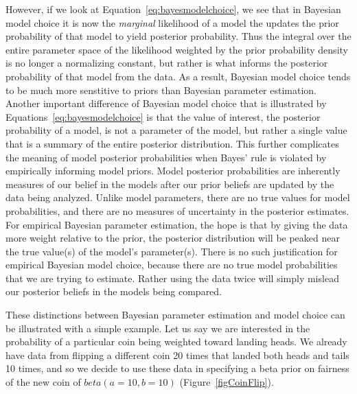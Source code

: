 However, if we look at Equation~\ref{eq:bayesmodelchoice}, we see that in
Bayesian model choice it is now the \emph{marginal} likelihood of a model
the updates the prior probability of that model to yield posterior
probability.
Thus the integral over the entire parameter space of the likelihood weighted by
the prior probability density is no longer a normalizing constant, but rather
is what informs the posterior probability of that model from the data.
As a result, Bayesian model choice tends to be much more senstitive to priors
than Bayesian parameter estimation.
Another important difference of Bayesian model choice that is illustrated by
Equations~\ref{eq:bayesmodelchoice} is that the value of interest, the
posterior probability of a model, is not a parameter of the model, but rather a
single value that is a summary of the entire posterior distribution.
This further complicates the meaning of model posterior probabilities when
Bayes' rule is violated by empirically informing model priors.
Model posterior probabilities are inherently measures of our belief in
the models after our prior beliefs are updated by the data being analyzed.
Unlike model parameters, there are no true values for model probabilities,
and there are no measures of uncertainty in the posterior estimates. 
For empirical Bayesian parameter estimation, the hope is that by giving the
data more weight relative to the prior, the posterior distribution will be
peaked near the true value(s) of the model's parameter(s).
There is no such justification for empirical Bayesian model choice, because
there are no true model probabilities that we are trying to estimate.
Rather using the data twice will simply mislead our posterior
beliefs in the models being compared.

These distinctions between Bayesian parameter estimation and model choice can
be illustrated with a simple example.
Let us say we are interested in the probability of a particular coin
being weighted toward landing heads.
We already have data from flipping a different coin 20 times
that landed both heads and tails 10 times, and so we decide to use
these data in specifying a beta prior on fairness of the new coin of
$beta(a=10, b=10)$ (Figure~\ref{figCoinFlip}).

